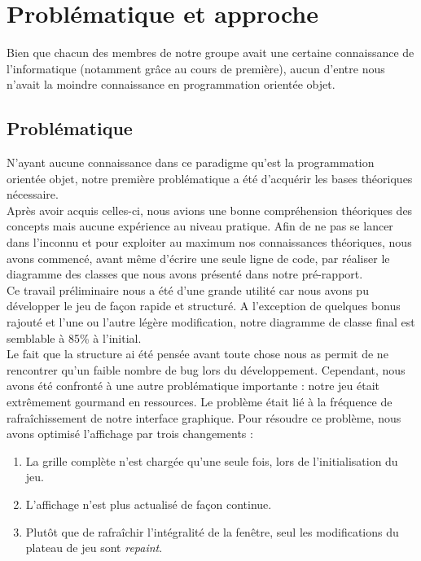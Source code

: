 \newpage
\section{Problématique et approche}
Bien que chacun des membres de notre groupe avait une certaine 
connaissance de l'informatique (notamment grâce au cours de 
première), aucun d'entre nous n'avait la moindre connaissance 
en programmation orientée objet.


	\subsection{Problématique}
	N'ayant aucune connaissance dans ce paradigme qu'est la 
	programmation orientée objet, notre première problématique
	a été d'acquérir les bases théoriques nécessaire.\\
	Après avoir acquis celles-ci, nous avions une bonne compréhension
	théoriques des concepts mais aucune expérience au niveau 
	pratique. Afin de ne pas se lancer dans l'inconnu et pour 
	exploiter au maximum nos connaissances théoriques, nous avons 
	commencé, avant même d'écrire une seule ligne de code, par 
	réaliser le diagramme des classes que nous avons présenté 
	dans notre pré-rapport.\\
	Ce travail préliminaire nous a été d'une grande utilité car 
	nous avons pu développer le jeu de façon rapide et structuré.
	A l'exception de quelques bonus rajouté et l'une ou l'autre
	légère modification, notre diagramme de classe final est 
	semblable à 85\% à l'initial.\\
	
	Le fait que la structure ai été pensée avant toute chose nous
	as permit de ne rencontrer qu'un faible nombre de bug lors du
	développement. Cependant, nous avons été confronté à une autre
	problématique importante : notre jeu était extrêmement gourmand 
	en ressources. Le problème était lié à la fréquence de 
	rafraîchissement de notre interface graphique. Pour résoudre ce
	problème, nous avons optimisé l'affichage par trois changements :
	\begin{enumerate}
	\item La grille complète n'est chargée qu'une seule fois, lors 
	de l'initialisation du jeu.
	\item L'affichage n'est plus actualisé de façon continue.
	\item Plutôt que de rafraîchir l'intégralité de la fenêtre, 
	seul les modifications du plateau de jeu sont \textit{repaint}.
	\end{enumerate}
	
